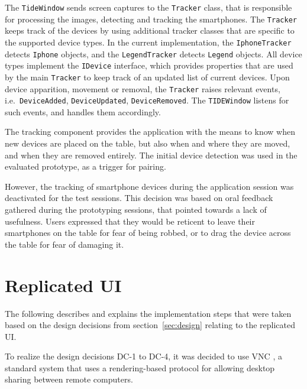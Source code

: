 The \texttt{TideWindow} sends screen captures to the \texttt{Tracker} class, that is responsible for processing the images, detecting and tracking the smartphones.
The \texttt{Tracker} keeps track of the devices by using additional tracker classes that are specific to the supported device types.
In the current implementation, the \texttt{IphoneTracker} detects \texttt{Iphone} objects, and the \texttt{LegendTracker} detects \texttt{Legend} objects.
All device types implement the \texttt{IDevice} interface, which provides properties that are used by the main \texttt{Tracker} to keep track of an updated list of current devices.
Upon device apparition, movement or removal, the \texttt{Tracker} raises relevant events, i.e.\ \texttt{DeviceAdded}, \texttt{DeviceUpdated}, \texttt{DeviceRemoved}.
The \texttt{TIDEWindow} listens for such events, and handles them accordingly.

The tracking component provides the application with the means to know when new devices are placed on the table, but also when and where they are moved, and when they are removed entirely.
The initial device detection was used in the evaluated prototype, as a trigger for pairing.

However, the tracking of smartphone devices during the application session was deactivated for the test sessions.
This decision was based on oral feedback gathered during the prototyping sessions, that pointed towards a lack of usefulness.
Users expressed that they would be reticent to leave their smartphones on the table for fear of being robbed, or to drag the device across the table for fear of damaging it.

\section{Replicated UI}
\label{sec:replicatedui}


The following describes and explains the implementation steps that were taken based on the design decisions from section~\ref{sec:design} relating to the replicated UI.

To realize the design decisions DC-1 to DC-4, it was decided to use VNC \citep{Richardson:1998:vnc}, a standard system that uses a rendering-based protocol for allowing desktop sharing between remote computers.


